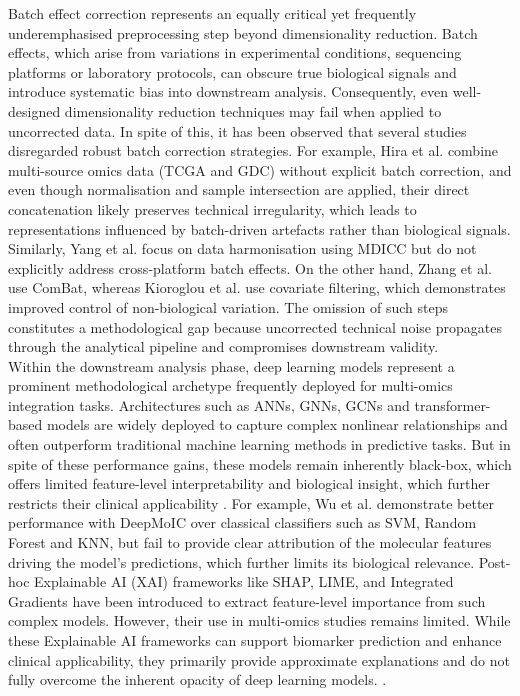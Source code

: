 \documentclass[conference]{IEEEtran}
\begin{document}
Batch effect correction represents an equally critical yet frequently underemphasised preprocessing step beyond dimensionality reduction. Batch effects, which arise from variations in experimental conditions, sequencing platforms or laboratory protocols, can obscure true biological signals and introduce systematic bias into downstream analysis\cite{goh_why_2017}. Consequently, even well-designed dimensionality reduction techniques may fail when applied to uncorrected data. In spite of this, it has been observed that several studies disregarded robust batch correction strategies\cite{shakyawar_icluf_nodate, yang_mdicc_2022, hira_integrated_2021}. For example, Hira et al. \cite{hira_integrated_2021} combine multi-source omics data (TCGA and GDC) without explicit batch correction, and even though normalisation and sample intersection are applied, their direct concatenation likely preserves technical irregularity, which leads to representations influenced by batch-driven artefacts rather than biological signals.
Similarly, Yang et al. \cite{yang_mdicc_2022} focus on data harmonisation using MDICC but do not explicitly address cross-platform batch effects.
On the other hand, Zhang et al. \cite{zhang_integrative_2025} use ComBat, whereas Kioroglou et al. \cite{kioroglou_multi-omic_2025} use covariate filtering, which demonstrates improved control of non-biological variation. The omission of such steps constitutes a methodological gap because uncorrected technical noise propagates through the analytical pipeline and compromises downstream validity.\\
Within the downstream analysis phase, deep learning models represent a prominent methodological archetype frequently deployed for multi-omics integration tasks. Architectures such as ANNs, GNNs, GCNs and transformer-based models are widely deployed to capture complex nonlinear relationships and often outperform traditional machine learning methods in predictive tasks\cite{sartori_comprehensive_2025}. But in spite of these performance gains, these models remain inherently black-box, which offers limited feature-level interpretability and biological insight, which further restricts their clinical applicability \cite{kang_roadmap_2022}. For example, Wu et al. \cite{wu_deepmoic_2024} demonstrate better performance with DeepMoIC over classical classifiers such as SVM, Random Forest and KNN, but fail to provide clear attribution of the molecular features driving the model's predictions, which further limits its biological relevance. Post-hoc Explainable AI (XAI) frameworks like SHAP, LIME, and Integrated Gradients have been introduced to extract feature-level importance from such complex models. However, their use in multi-omics studies remains limited. While these Explainable AI frameworks can support biomarker prediction and enhance clinical applicability, they primarily provide approximate explanations and do not fully overcome the inherent opacity of deep learning models. \cite{noauthor_full_nodate}.\\
\end{document}
